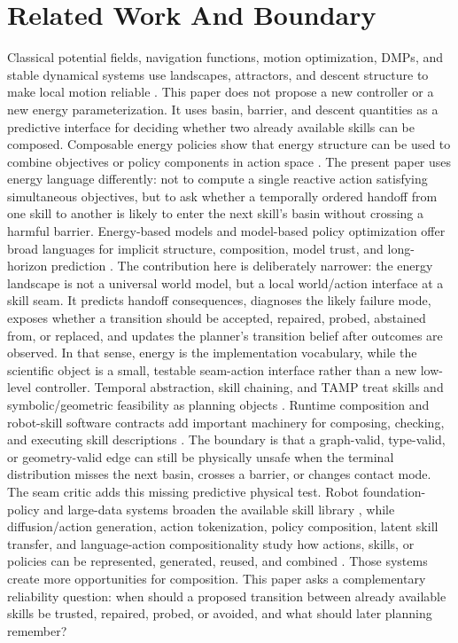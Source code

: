 \documentclass{article}
\begin{document}
\section{Related Work And Boundary}
Classical potential fields, navigation functions, motion optimization, DMPs, and stable dynamical systems use landscapes, attractors, and descent structure to make local motion reliable \citep{khatib1986potential,koditschek1989navigation,ratliff2009chomp,ijspeert2013dmp,khansari2011stable}. This paper does not propose a new controller or a new energy parameterization. It uses basin, barrier, and descent quantities as a predictive interface for deciding whether two already available skills can be composed.
Composable energy policies show that energy structure can be used to combine objectives or policy components in action space \citep{urain2021cep}. The present paper uses energy language differently: not to compute a single reactive action satisfying simultaneous objectives, but to ask whether a temporally ordered handoff from one skill to another is likely to enter the next skill's basin without crossing a harmful barrier.
Energy-based models and model-based policy optimization offer broad languages for implicit structure, composition, model trust, and long-horizon prediction \citep{lecun2006energy,du2019implicit,janner2019mbpo}. The contribution here is deliberately narrower: the energy landscape is not a universal world model, but a local world/action interface at a skill seam. It predicts handoff consequences, diagnoses the likely failure mode, exposes whether a transition should be accepted, repaired, probed, abstained from, or replaced, and updates the planner's transition belief after outcomes are observed. In that sense, energy is the implementation vocabulary, while the scientific object is a small, testable seam-action interface rather than a new low-level controller.
Temporal abstraction, skill chaining, and TAMP treat skills and symbolic/geometric feasibility as planning objects \citep{sutton1999options,konidaris2009skillchaining,kaelbling2011tamp,garrett2021integrated}. Runtime composition and robot-skill software contracts add important machinery for composing, checking, and executing skill descriptions \citep{pane2021runtime,rizwan2025ezskiros}. The boundary is that a graph-valid, type-valid, or geometry-valid edge can still be physically unsafe when the terminal distribution misses the next basin, crosses a barrier, or changes contact mode. The seam critic adds this missing predictive physical test.
Robot foundation-policy and large-data systems broaden the available skill library \citep{florence2022implicit,brohan2023rt1,openx2023}, while diffusion/action generation, action tokenization, policy composition, latent skill transfer, and language-action compositionality study how actions, skills, or policies can be represented, generated, reused, and combined \citep{chi2023diffusionpolicy,wang2024poco,liu2026oat,julian2020latent,vijayaraghavan2025compositionality}. Those systems create more opportunities for composition. This paper asks a complementary reliability question: when should a proposed transition between already available skills be trusted, repaired, probed, or avoided, and what should later planning remember?
\end{document}
